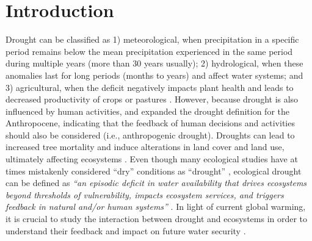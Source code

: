 \documentclass[
  authoryear,
  preprint,
  3p,
  onecolumn]{elsarticle}
\begin{document}
\ifdefined\Shaded\renewenvironment{Shaded}{\begin{tcolorbox}[breakable, borderline west={3pt}{0pt}{shadecolor}, frame hidden, enhanced, sharp corners, boxrule=0pt, interior hidden]}{\end{tcolorbox}}\fi

\hypertarget{introduction}{%
\section{Introduction}\label{introduction}}

Drought can be classified as 1) meteorological, when precipitation in a
specific period remains below the mean precipitation experienced in the
same period during multiple years (more than 30 years usually); 2)
hydrological, when these anomalies last for long periods (months to
years) and affect water systems; and 3) agricultural, when the deficit
negatively impacts plant health and leads to decreased productivity of
crops or pastures \citep{Wilhite1985}. However, because drought is also
influenced by human activities, \citet{Loon2016} and
\citet{AghaKouchak2021} expanded the drought definition for the
Anthropocene, indicating that the feedback of human decisions and
activities should also be considered (i.e., anthropogenic drought).
Droughts can lead to increased tree mortality \citep{Cheng2024} and
induce alterations in land cover and land use, ultimately affecting
ecosystems \citep{Crausbay2017}. Even though many ecological studies
have at times mistakenly considered ``dry'' conditions as ``drought''
\citep{Slette2019}, ecological drought can be defined as \emph{``an
episodic deficit in water availability that drives ecosystems beyond
thresholds of vulnerability, impacts ecosystem services, and triggers
feedback in natural and/or human systems''} \citep{Crausbay2017}. In
light of current global warming, it is crucial to study the interaction
between drought and ecosystems in order to understand their feedback and
impact on future water security \citep{Bakker2012}.
\end{document}
